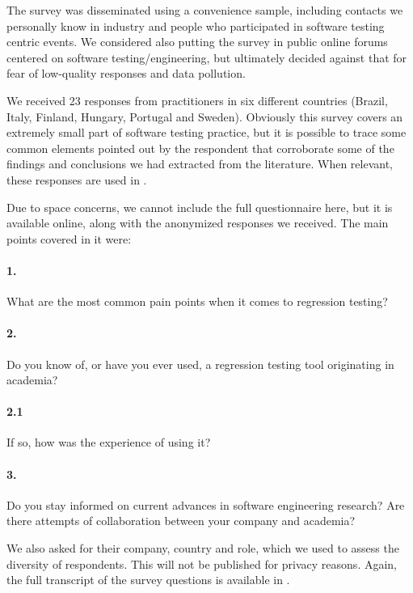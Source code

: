 The survey was disseminated using a convenience sample, including contacts we personally know in industry and people who participated in software testing centric events.
We considered also putting the survey in public online forums centered on software testing/engineering, but ultimately decided against that for fear of low-quality responses and data pollution.

We received 23 responses from practitioners in six different countries (Brazil, Italy, Finland, Hungary, Portugal and Sweden). 
Obviously this survey covers an extremely small part of software testing practice, but it is possible to trace some common elements pointed out by the respondent that corroborate some of the findings and conclusions we had extracted from the literature.
When relevant, these responses are used in .

Due to space concerns, we cannot include the full questionnaire here, but it is available online, along with the anonymized responses we received.
The main points covered in it were:
\begin{tcolorbox}%
\small
\paragraph{1.} What are the most common pain points when it comes to regression testing?
	
\paragraph{2.} Do you know of, or have you ever used, a regression testing tool originating in academia?

\paragraph{2.1} If so, how was the experience of using it?
	
\paragraph{3.} Do you stay informed on current advances in software engineering research? Are there attempts of collaboration between your company and academia?
	
\end{tcolorbox}

We also asked for their company, country and role, which we used to assess the diversity of respondents. This will not be published for privacy reasons.
Again, the full transcript of the survey questions is available in .

